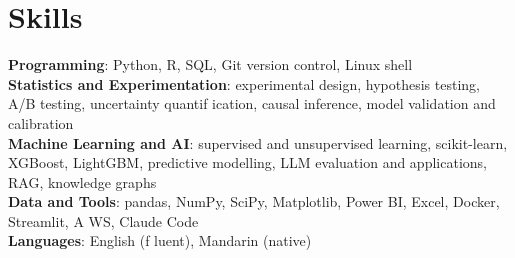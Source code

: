 \documentclass[letterpaper,11pt]{article}
\begin{document}
\section{\textbf{Skills}}
 \begin{itemize}[leftmargin=0.15in, label={}]
    \small{\item{
     \textbf{Programming}{: Python, R, SQL, Git version control, Linux shell} \\
     \textbf{Statistics and Experimentation}{: experimental design, hypothesis testing, A/B testing, uncertainty quantif\kern0pt ication, causal inference, model validation and calibration} \\
     \textbf{Machine Learning and AI}{: supervised and unsupervised learning, scikit-learn, XGBoost, LightGBM, predictive modelling, LLM evaluation and applications, RAG, knowledge graphs} \\
     \textbf{Data and Tools}{: pandas, NumPy, SciPy, Matplotlib, Power BI, Excel, Docker, Streamlit, A\kern0pt WS, Claude Code} \\
     \textbf{Languages}{: English (f\kern0pt luent), Mandarin (native)}}}

 \end{itemize}
\end{document}
